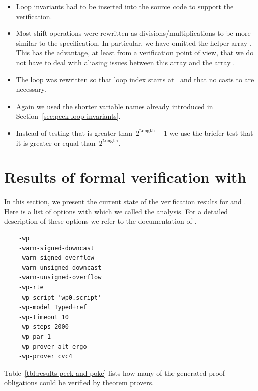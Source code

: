 \begin{itemize}
\item Loop invariants had to be inserted into
      the source code to support the verification.

\item Most shift operations were rewritten as divisions\slash multiplications
      to be more similar to the specification. 
      In particular, we have omitted the helper array .
      This has the advantage, at least from a verification point of view,
      that we do not have to deal with aliasing issues between this array
      and the array .

\item The loop was rewritten so that loop index starts at~
      and that no casts to  are necessary.

\item Again we used the shorter variable names already introduced in
      Section~\ref{sec:peek-loop-invariants}.

\item Instead of testing that  is greater than~$2^\mathtt{Length} - 1$
      we use the briefer test that it is greater or equal than~$2^\mathtt{Length}$.

\end{itemize}


\clearpage

\section{Results of formal verification with \framacwp}
\label{sec:verification-results}

In this section, we present the current state of the verification results 
for \peek and \poke.
Here is a list of options with which we called the \framacwp analysis.
For a detailed description of these options we refer to the documentation
of \framac.

\begin{verbatim}
    -wp
    -warn-signed-downcast
    -warn-signed-overflow
    -warn-unsigned-downcast
    -warn-unsigned-overflow
    -wp-rte
    -wp-script 'wp0.script'
    -wp-model Typed+ref
    -wp-timeout 10
    -wp-steps 2000
    -wp-par 1
    -wp-prover alt-ergo
    -wp-prover cvc4
\end{verbatim}

Table~\ref{tbl:results-peek-and-poke} lists how many of the generated proof
obligations could be verified by theorem provers.

